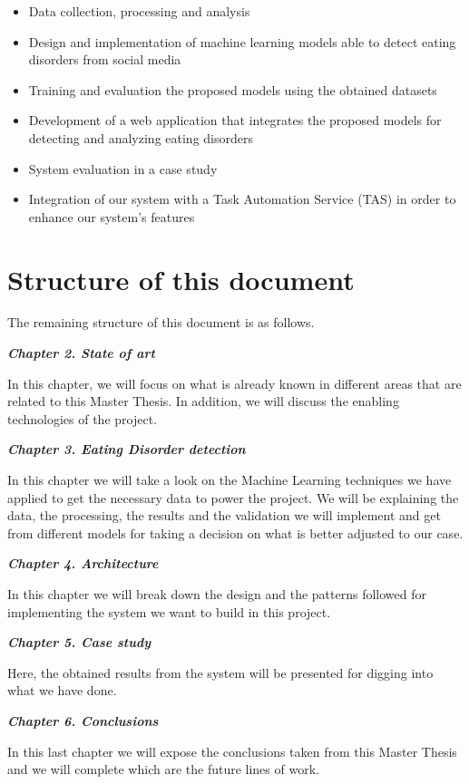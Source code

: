 \begin{itemize}
    \item Data collection, processing and analysis
    \item Design and implementation of machine learning models able to detect eating disorders from social media
    \item Training and evaluation the proposed models using the obtained datasets
    \item Development of a web application that integrates the proposed models for detecting and analyzing eating disorders
    \item System evaluation in a case study
    \item Integration of our system with a Task Automation Service (TAS) in order to enhance our system's features
\end{itemize}

\clearpage

\section{Structure of this document}

The remaining structure of this document is as follows.

\textbf{\textit{Chapter 2. State of art}}

In this chapter, we will focus on what is already known in different areas that are related to this Master Thesis. In addition, we will discuss the enabling technologies of
the project.

\textbf{\textit{Chapter 3. Eating Disorder detection}} 

In this chapter we will take a look on the Machine Learning techniques we have applied to get the necessary data to power the project. We will be explaining the data, the processing, the results and the validation we will implement and get from different models for taking a decision on what is better adjusted to our case.

\textbf{\textit{Chapter 4. Architecture}} 

In this chapter we will break down the design and the patterns followed for implementing the system we want to build in this project.

\textbf{\textit{Chapter 5. Case study}}

Here, the obtained results from the system will be presented for digging into what we have done.

\textbf{\textit{Chapter 6. Conclusions}} 

In this last chapter we will expose the conclusions taken from this Master Thesis and we will complete which are the future lines of work.

